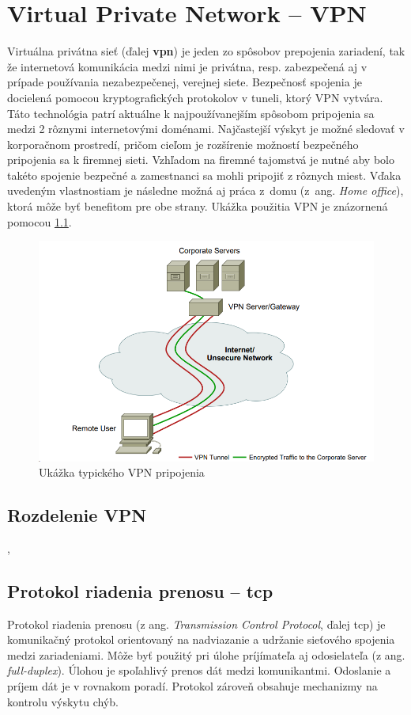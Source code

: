 
\chapter{Virtual Private Network -- VPN}\label{1}
Virtuálna privátna sieť (ďalej \textbf{\acrshort{vpn}}) je jeden zo spôsobov prepojenia zariadení, tak že internetová komunikácia medzi nimi je privátna, resp. zabezpečená aj v prípade používania nezabezpečenej, verejnej siete. Bezpečnosť spojenia je docielená pomocou kryptografických protokolov v tuneli, ktorý VPN vytvára. 
Táto technológia patrí aktuálne k najpoužívanejším spôsobom pripojenia sa medzi 2 rôznymi internetovými doménami. Najčastejší výskyt je možné sledovať v korporačnom prostredí, pričom cieľom je rozšírenie možností bezpečného pripojenia sa k firemnej sieti. Vzhľadom na firemné tajomstvá je nutné aby bolo takéto spojenie bezpečné a zamestnanci sa mohli pripojiť z rôznych miest. Vďaka uvedeným vlastnostiam je následne možná aj práca z~domu (z~ang. \textit{Home office}), ktorá môže byť benefitom pre obe strany. Ukážka použitia VPN je znázornená pomocou \ref{vpndemo}. 
\begin{figure}[!ht]
	\centering
	\includegraphics[width=.9\textwidth]{figures/VPNdemo}
	\caption{Ukážka typického VPN pripojenia}
	\label{vpndemo}
\end{figure}

\section{Rozdelenie VPN}
\cite{divvpn}, \cite{ciscovpn}

\section{Protokol riadenia prenosu -- \acrshort{tcp}}
Protokol riadenia prenosu (z ang. \textit{Transmission Control Protocol}, ďalej \acrshort{tcp}) je komunikačný protokol orientovaný na nadviazanie a udržanie sieťového spojenia medzi zariadeniami. Môže byť použitý pri úlohe príjímateľa aj odosielateľa (z ang. \textit{full-duplex}). Úlohou je spoľahlivý prenos dát medzi komunikantmi. Odoslanie a príjem dát je v rovnakom poradí. Protokol zároveň obsahuje mechanizmy na kontrolu výskytu chýb. 

